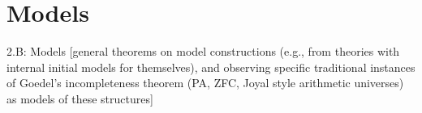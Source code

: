 \section{Models}

2.B: Models [general theorems on model constructions (e.g., from theories with internal initial models for themselves), and observing specific traditional instances of Goedel’s incompleteness theorem (PA, ZFC, Joyal style arithmetic universes) as models of these structures]